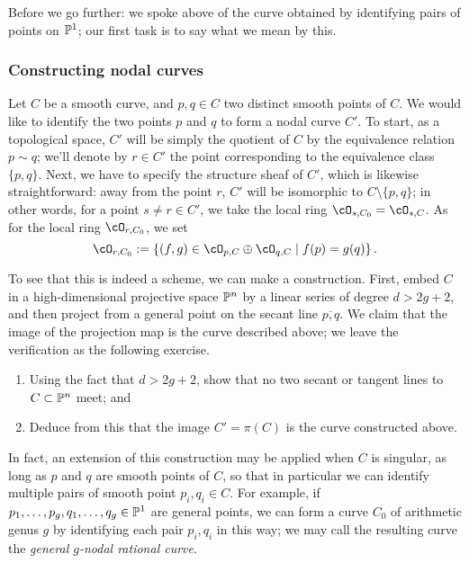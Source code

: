 Before we go further: we spoke above of the curve obtained by identifying pairs of points on $\PP^1$; our first task is to say what we mean by this.

\subsubsection{Constructing nodal curves}

Let $C$ be a smooth curve, and $p, q \in C$ two distinct smooth points of $C$. We would like to identify the two points $p$ and $q$ to form a nodal curve $C'$. To start, as a topological space, $C'$ will be simply the quotient of $C$ by the equivalence relation $p \sim q$; we'll denote by $r \in C'$ the point corresponding to the equivalence class $\{p, q\}$. Next, we have to specify the structure sheaf of $C'$, which is likewise straightforward: away from the point $r$, $C'$ will be isomorphic to $C \setminus \{p,q\}$; in other words, for a point $s \neq r \in C'$, we take the local ring $\cO_{s, C_0} = \cO_{s,C}$. As for the local ring $\cO_{r, C_0}$, we set
$$
\cO_{r, C_0} := \left\{ (f,g) \in \cO_{p,C} \oplus \cO_{q,C} \mid f(p) = g(q) \right\}.
$$

To see that this is indeed a scheme, we can make a construction. First, embed $C$ in a high-dimensional projective space $\PP^n$ by a linear series of degree $d > 2g+2$, and then project from a general point on the secant line $\overline{p,q}$. We claim that the image of the projection map is the curve described above; we leave the verification as the following exercise.

\begin{exercise}
\begin{enumerate}
\item Using the fact that $d > 2g+2$, show that no two secant or tangent lines to $C \subset \PP^n$ meet; and
\item Deduce from this that the image $C' = \pi(C)$ is the curve constructed above.
\end{enumerate}
\end{exercise}

In fact, an extension of this construction may be applied when $C$ is singular, as long as $p$ and $q$ are smooth points of $C$, so that in particular we can identify multiple pairs of smooth point $p_i, q_i \in C$. For example, if $p_1,\dots,p_g, q_1,\dots, q_g \in \PP^1$ are general points, we can form a curve $C_0$ of arithmetic genus $g$ by identifying each pair $p_i, q_i$ in this way; we may call the resulting curve the \emph{general $g$-nodal rational curve}.

